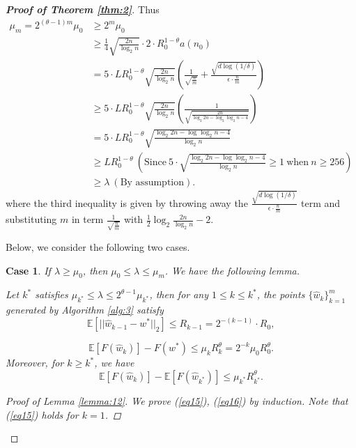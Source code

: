 \documentclass[12pt]{alt2022} %
\newtheorem{case}{Case}
\begin{document}
\begin{proof}[{\bf Proof of Theorem \ref{thm:2}}]
Thus 		\begin{equation}\label{eq22}
\begin{aligned}
\mu_m=2^{(\theta-1)m} \mu_0&\geq 2^m\mu_0\\
&\geq \frac{1}{4}\sqrt{\frac{2n}{\log_2 n}}\cdot 2\cdot R_0^{1-\theta}a(n_0)\\
&=5\cdot L R_0^{1-\theta}\sqrt{\frac{2n}{\log_2 n}}\left(\frac{1}{\sqrt{\frac{n}{m}}}+\frac{\sqrt{d\log(1/\delta)}}{\epsilon\cdot\frac{n}{m}}\right)\\
&\geq 5\cdot L R_0^{1-\theta}\sqrt{\frac{2n}{\log_2 n}}\left(\frac{1}{\sqrt{\frac{2n}{\log_2 2n-\log_2\log_2 n-4}}}\right)\\
&=5\cdot L R_0^{1-\theta}\sqrt{\frac{\log_2 2n-\log\log_2 n-4}{\log_2 n}}\\&\geq L R_0^{1-\theta}~\left(\text{Since}~5\cdot\sqrt{\frac{\log_2 2n-\log\log_2 n-4}{\log_2 n}}\geq 1~ \text{when}~ n\geq 256\right)\\
&\geq \lambda~(\text{By assumption}).
\end{aligned}
\end{equation}
where the third inequality is given by throwing away the $\frac{\sqrt{d\log(1/\delta)}}{\epsilon\cdot\frac{n}{m}}$ term and substituting $ m$ in term $\frac{1}{\sqrt{\frac{n}{m}}}$ with $\frac{1}{2}\log_2\frac{2n}{\log_2 n}-2$.

Below, we consider the following two cases.
\begin{case}
	If $\lambda\geq \mu_0$, then $\mu_0\leq \lambda\leq \mu_m$. We have the following lemma.
	\begin{lemma}\label{lemma:12}
		Let $k^{*}$ satisfies $\mu_{k^{*}}\leq \lambda \leq 2^{\theta -1}\mu_{k^{*}}$, then for any $1\leq k\leq k^{*}$, the points $\{\hat{w}_k\}_{k=1}^{m}$ generated by Algorithm \ref{alg:3} satisfy
		\begin{equation}\label{eq15}
		\mathbb{E}[||\hat{w}_{k-1}-w^{*}||_2]\leq R_{k-1}=2^{-(k-1)}\cdot R_0,
		\end{equation}
		
			\begin{equation}\label{eq16}
		\mathbb{E}[F(\hat{w}_k)]-F(w^{*})\leq \mu_k R_k^{\theta} =2^{-k}\mu_0 R_0^{\theta}.
		\end{equation}
		Moreover, for $k\geq k^{*}$, we have 
			\begin{equation}\label{eq17}
		\mathbb{E}[F(\hat{w}_k)]-\mathbb{E}[F(\hat{w}_{k^{*}})]\leq \mu_{k^{*}}R_{k^{*}}^{\theta}.
		\end{equation}
	\end{lemma}
\begin{proof}[Proof of Lemma \ref{lemma:12}]
We prove (\ref{eq15}), (\ref{eq16}) by induction. Note that (\ref{eq15}) holds for $k=1$.


\end{proof}
\end{case}
\end{proof}
\end{document}
